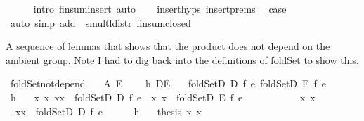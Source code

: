 \begin{isabellebody}
\ \ \ \ \isamarkupfalse%
\ {\isacharparenleft}intro\ finsum{\isacharunderscore}insert{\isacharcomma}\ auto{\isacharparenright}\isanewline
\ \ \isamarkupfalse%
\ insert{\isachardot}hyps\ insert{\isachardot}prems\ \isamarkupfalse%
\ {\isacharquery}case\ \isanewline
\ \ \ \ \isamarkupfalse%
\ {\isacharparenleft}auto\ simp\ add{\isacharcolon}{}\ {}\ smult{\isacharunderscore}l{\isacharunderscore}distr\ finsum{\isacharunderscore}closed{\isacharparenright}\isanewline
{}\isamarkupfalse%
%
\endisatagproof
{\isafoldproof}%
%
\isadelimproof
%
\endisadelimproof
%
\begin{isamarkuptext}%
A sequence of lemmas that shows that the product does not depend on the ambient group. 
Note I had to dig back into the definitions of foldSet to show this.%
\end{isamarkuptext}%
\isamarkuptrue%
\isamarkupfalse%
\ foldSet{\isacharunderscore}not{\isacharunderscore}depend{\isacharcolon}\isanewline
\ \ \ A\ E\ \isanewline
\ \ \ h{}{\isacharcolon}\ {\isachardoublequoteopen}D{\isasymsubseteq}E{\isachardoublequoteclose}\isanewline
\ \ \ {\isachardoublequoteopen}foldSetD\ D\ f\ e\ {\isasymsubseteq}foldSetD\ E\ f\ e{\isachardoublequoteclose}\isanewline
%
\isadelimproof
%
\endisadelimproof
%
\isatagproof
{}\isamarkupfalse%
\ {\isacharminus}\isanewline
\ \ \isamarkupfalse%
\ h{}\ \isamarkupfalse%
\ {}{\isacharcolon}\ {\isachardoublequoteopen}{\isasymAnd}x{}\ x{}{\isachardot}\ {\isacharparenleft}x{}{\isacharcomma}x{}{\isacharparenright}\ {\isasymin}\ foldSetD\ D\ f\ e\ {\isasymLongrightarrow}\ {\isacharparenleft}x{}{\isacharcomma}\ x{}{\isacharparenright}\ {\isasymin}\ foldSetD\ E\ f\ e{\isachardoublequoteclose}\ \isanewline
\ \ \isamarkupfalse%
\ {\isacharminus}\isanewline
\ \ \ \ \isamarkupfalse%
\ x{}\ x{}\ \isanewline
\ \ \ \ \isamarkupfalse%
\ {}{\isacharcolon}\ {\isachardoublequoteopen}{\isacharparenleft}x{}{\isacharcomma}x{}{\isacharparenright}\ {\isasymin}\ foldSetD\ D\ f\ e{\isachardoublequoteclose}\isanewline
\ \ \ \ \isamarkupfalse%
\ h{}\ {}\ \isamarkupfalse%
\ {\isachardoublequoteopen}{\isacharquery}thesis\ x{}\ x{}{\isachardoublequoteclose}\isanewline

\end{isabellebody}
